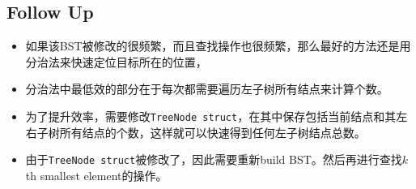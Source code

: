 \subsection{Follow Up}
\begin{CJK*}{UTF8}{gbsn}
\begin{itemize}
\item 如果该BST被修改的很频繁，而且查找操作也很频繁，那么最好的方法还是用分治法来快速定位目标所在的位置，
\item 分治法中最低效的部分在于每次都需要遍历左子树所有结点来计算个数。
\item 为了提升效率，需要修改\texttt{TreeNode struct}，在其中保存包括当前结点和其左右子树所有结点的个数，这样就可以快速得到任何左子树结点总数。
\item 由于\texttt{TreeNode struct}被修改了，因此需要重新build BST。然后再进行查找$k$th smallest element的操作。
\end{itemize}
\end{CJK*}
